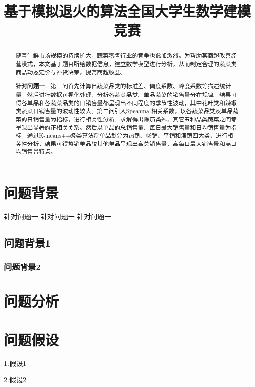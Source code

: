 \documentclass[withoutpreface,bwprint]{cumcmthesis} %
\title{基于模拟退火的算法全国大学生数学建模竞赛}
\begin{document}
 \maketitle
 \begin{abstract}
随着生鲜市场规模的持续扩大，蔬菜零售行业的竞争也愈加激烈。为帮助某商超改善经营模式，本文基于题目所给数据信息，建立数学模型进行分析，从而制定合理的蔬菜类商品动态定价与补货决策，提高商超收益。

\textbf{针对问题一}，第一问首先计算出蔬菜品类的标准差、偏度系数、峰度系数等描述统计量。然后进行数据可视化处理，分析各蔬菜品类、单品蔬菜的销售量分布规律。结果可得各单品和各蔬菜品类的日销售量都呈现出不同程度的季节性波动，其中花叶类和辣椒类蔬菜日销售量的波动性较大。第二问引入Speanma 相关系数，以各蔬菜品类及单品蔬菜的日销售量为指标，进行相关性分析，求解得出除茄类外，其它五种品类蔬菜之间都呈现出显著的正相关关系。然后以单品的总销售量、每日最大销售量和日均销售量为指标，通过K-means++聚类算法将单品划分为热销、畅销、平销和滞销四大类，进行相关性分析，结果可得热销单品较其他单品呈现出高总销售量，高每日最大销售景和高日均销售景特点。

\end{abstract}



\section{问题背景}%
针对问题一
针对问题一
针对问题一
\subsection{问题背景1}%
\subsubsection{问题背景2}%
\section{问题分析}
\section{问题假设}
1.假设1

2.假设2
\end{document}

